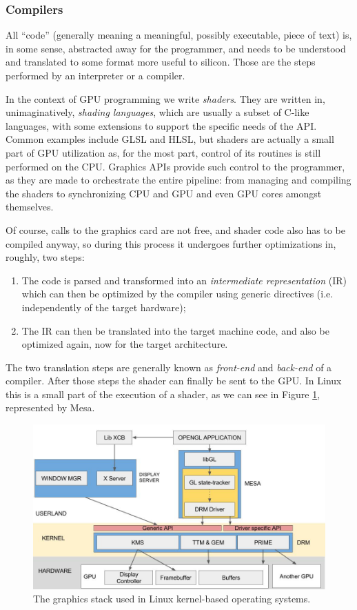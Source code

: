 \documentclass[11pt, conference, onecolumn, final]{IEEEtran}
\begin{document}
\subsubsection{Compilers} \label{sec:proposal:compilers}

All ``code'' (generally meaning a meaningful, possibly executable, piece of
text) is, in some sense, abstracted away for the programmer, and needs to be
understood and translated to some format more useful to silicon.
Those are the steps performed by an interpreter or a compiler.

In the context of GPU programming we write \textit{shaders}.
They are written in, unimaginatively, \textit{shading languages}, which are
usually a subset of C-like languages, with some extensions to support the
specific needs of the API.
Common examples include GLSL and HLSL, but shaders are actually a small part of
GPU utilization as, for the most part, control of its routines is still
performed on the CPU.
Graphics APIs provide such control to the programmer, as they are made to
orchestrate the entire pipeline: from managing and compiling the shaders to
synchronizing CPU and GPU and even GPU cores amongst themselves.

Of course, calls to the graphics card are not free, and shader code also has to
be compiled anyway, so during this process it undergoes further optimizations
in, roughly, two steps:
\begin{enumerate}
    \item The code is parsed and transformed into an \textit{intermediate
        representation} (IR) which can then be optimized by the compiler using
        generic directives (i.e. independently of the target hardware);
    \item The IR can then be translated into the target machine code, and also
        be optimized again, now for the target architecture.
\end{enumerate}
The two translation steps are generally known as \textit{front-end} and
\textit{back-end} of a compiler. After those steps the shader can finally be
sent to the GPU.
In Linux this is a small part of the execution of a shader, as we can see in
Figure \ref{fig:linux-gs}, represented by Mesa.

\begin{figure}[H]
    \centering
    \includegraphics[width=0.8\linewidth]{linux-stack.jpeg}
    \caption{The graphics stack used in Linux kernel-based operating systems.}
    \label{fig:linux-gs}
    \end{figure}
\end{document}
